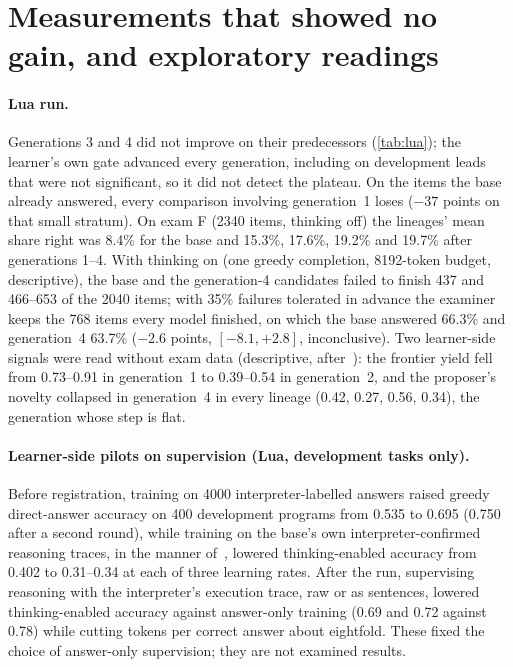 \section{Measurements that showed no gain, and exploratory readings}\label{app:other}

\paragraph{Lua run.} Generations 3 and 4 did not improve on their predecessors (\cref{tab:lua}); the learner's own gate
advanced every generation, including on development leads that were not significant, so it did not detect the plateau. On the
items the base already answered, every comparison involving generation~1 loses ($-37$ points on that small stratum). On exam F
(2340 items, thinking off) the lineages' mean share right was 8.4\% for the base and 15.3\%, 17.6\%, 19.2\% and 19.7\% after
generations 1--4. With thinking on (one greedy completion, 8192-token budget, descriptive), the base and the generation-4
candidates failed to finish 437 and 466--653 of the 2040 items; with 35\% failures tolerated in advance the examiner keeps the
768 items every model finished, on which the base answered 66.3\% and generation~4 63.7\% ($-2.6$ points, $[-8.1, +2.8]$,
inconclusive). Two learner-side signals were read without exam data (descriptive, after~\cite{cai2026nosecondrun}): the frontier
yield fell from 0.73--0.91 in generation~1 to 0.39--0.54 in generation~2, and the proposer's novelty collapsed in generation~4
in every lineage (0.42, 0.27, 0.56, 0.34), the generation whose step is flat.

\paragraph{Learner-side pilots on supervision (Lua, development tasks only).} Before registration, training on 4000
interpreter-labelled answers raised greedy direct-answer accuracy on 400 development programs from 0.535 to 0.695 (0.750 after a
second round), while training on the base's own interpreter-confirmed reasoning traces, in the manner
of~\cite{zelikman2022star,singh2023rest}, lowered thinking-enabled accuracy from 0.402 to 0.31--0.34 at each of three learning
rates. After the run, supervising reasoning with the interpreter's execution trace, raw or as sentences, lowered thinking-enabled
accuracy against answer-only training (0.69 and 0.72 against 0.78) while cutting tokens per correct answer about eightfold.
These fixed the choice of answer-only supervision; they are not examined results.

